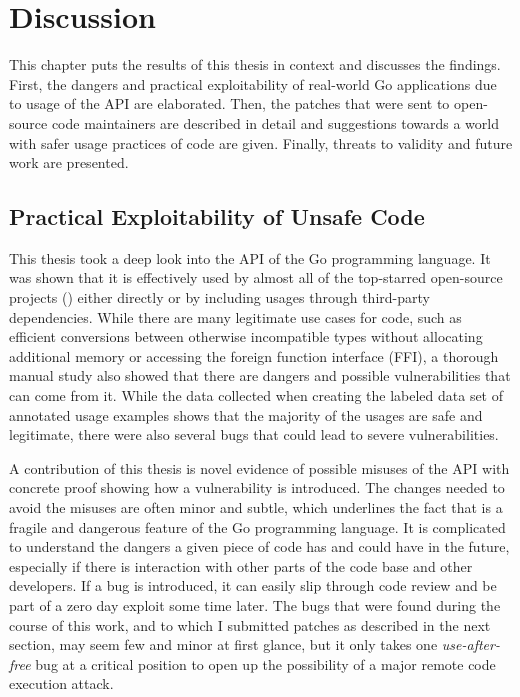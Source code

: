 
\chapter{Discussion}\label{ch:discussion}

This chapter puts the results of this thesis in context and discusses the findings.
First, the dangers and practical exploitability of real-world Go applications due to usage of the \unsafe{} API are
elaborated.
Then, the patches that were sent to open-source code maintainers  are described in detail and suggestions towards a
world with safer usage practices of \unsafe{} code are given.
Finally, threats to validity and future work are presented.



\section{Practical Exploitability of Unsafe Code}\label{sec:discussion:exploitability}

This thesis took a deep look into the \unsafe{} API of the Go programming language.
It was shown that it is effectively used by almost all of the \projsAnalyzed{} top-starred open-source projects
(\percentageUnsafeTransitiveWithDependencies{}) either directly or by including \unsafe{} usages through third-party
dependencies.
While there are many legitimate use cases for \unsafe{} code, such as efficient conversions between otherwise
incompatible types without allocating additional memory or accessing the foreign function interface (\acrshort{FFI}),
a thorough manual study also showed that there are dangers and possible vulnerabilities that can come from it.
While the data collected when creating the labeled data set of annotated \unsafe{} usage examples shows that the
majority of the usages are safe and legitimate, there were also several bugs that could lead to severe vulnerabilities.

A contribution of this thesis is novel evidence of possible misuses of the \unsafe{} \acrshort{API} with concrete proof
showing how a vulnerability is introduced.
The changes needed to avoid the misuses are often minor and subtle, which underlines the fact that \unsafe{} is a
fragile and dangerous feature of the Go programming language.
It is complicated to understand the dangers a given piece of code has and could have in the future, especially if there
is interaction with other parts of the code base and other developers.
If a bug is introduced, it can easily slip through code review and be part of a zero day exploit some time later.
The bugs that were found during the course of this work, and to which I submitted patches as described in the next
section, may seem few and minor at first glance, but it only takes one \textit{use-after-free} bug at a critical
position to open up the possibility of a major remote code execution attack.

